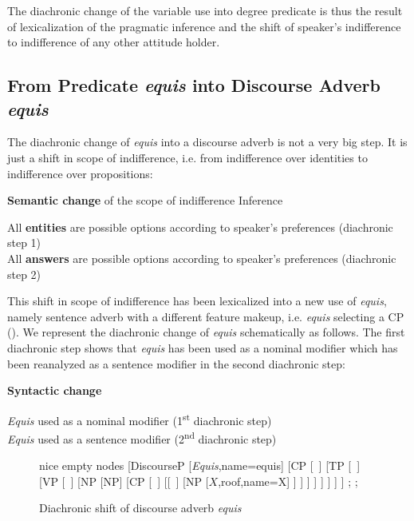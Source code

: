 \documentclass[output=paper
,modfonts
,nonflat]{langsci/langscibook}
\begin{document}
The diachronic change of the variable use into degree predicate is thus the result of lexicalization of the pragmatic inference and the shift of speaker’s indifference to indifference of any other attitude holder.


\subsection{From Predicate \textit{equis} into Discourse Adverb \textit{equis}}\label{sec:kellert:4.2}
The diachronic change of \textit{equis} into a discourse adverb is not a very big step. It is just a shift in scope of indifference, i.e. from indifference over identities to indifference over propositions:

\ea \textbf{Semantic change} of the scope of indifference Inference\\
\begin{xlist}
 All \textbf{entities} are possible options according to speaker’s preferences (diachronic step 1)\\
 All \textbf{answers} are possible options according to speaker’s preferences (diachronic step 2)
\end{xlist}
\z

This shift in scope of indifference has been lexicalized into a new use of \textit{equis}, namely sentence adverb with a different feature makeup, i.e. \textit{equis} selecting a CP (). We represent the diachronic change of \textit{equis} schematically as follows. The first diachronic step shows that \textit{equis} has been used as a nominal modifier which has been reanalyzed as a sentence modifier in the second diachronic step:

\ea \textbf{Syntactic change}\\
\begin{xlist}
	\textit{Equis} used as a nominal modifier (1\textsuperscript{st} diachronic step)\\
	\textit{Equis} used as a sentence modifier (2\textsuperscript{nd} diachronic step)\\
\end{xlist}
\z

\begin{figure}
	\caption{Diachronic shift of discourse adverb \textit{equis}\label{fig:kellert:tree4n}}
	\begin{forest} nice empty nodes
	[DiscourseP
	[\textit{Equis},name=equis] [CP
	[~] [TP
	[~] [VP
	[~] [NP
	[NP] [CP
	[~] [[~] [NP
	[$X$,roof,name=X]
	]
	]
	]
	]
	]
	]
	]
	]
	;
	;	
\end{forest}
\end{figure}
\end{document}
